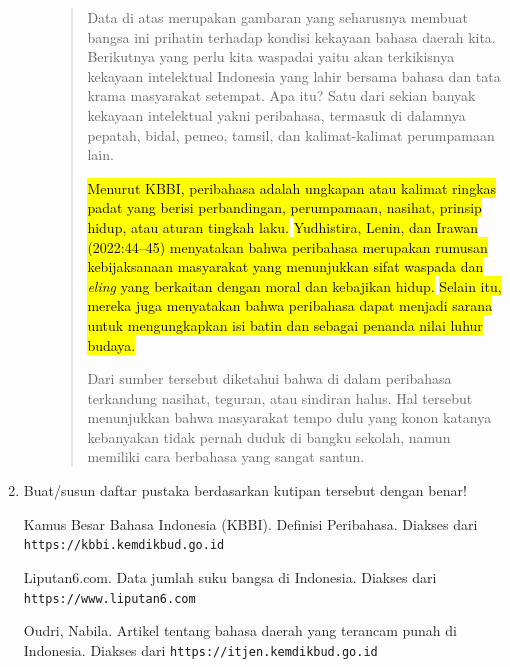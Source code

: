 \documentclass[12pt]{article}
\begin{document}
\begin{enumerate}
\begin{enumerate}
\begin{quote}
Data di atas merupakan gambaran yang seharusnya membuat bangsa ini prihatin terhadap kondisi kekayaan bahasa daerah kita. Berikutnya yang perlu kita waspadai yaitu akan terkikisnya kekayaan intelektual Indonesia yang lahir bersama bahasa dan tata krama masyarakat setempat. Apa itu? Satu dari sekian banyak kekayaan intelektual yakni peribahasa, termasuk di dalamnya pepatah, bidal, pemeo, tamsil, dan kalimat-kalimat perumpamaan lain.

\hl{Menurut KBBI, peribahasa adalah ungkapan atau kalimat ringkas padat yang berisi perbandingan, perumpamaan, nasihat, prinsip hidup, atau aturan tingkah laku.} \hl{Yudhistira, Lenin, dan Irawan (2022:44--45) menyatakan bahwa peribahasa merupakan rumusan kebijaksanaan masyarakat yang menunjukkan sifat waspada dan \textit{eling} yang berkaitan dengan moral dan kebajikan hidup.} \hl{Selain itu, mereka juga menyatakan bahwa peribahasa dapat menjadi sarana untuk mengungkapkan isi batin dan sebagai penanda nilai luhur budaya.}

Dari sumber tersebut diketahui bahwa di dalam peribahasa terkandung nasihat, teguran, atau sindiran halus. Hal tersebut menunjukkan bahwa masyarakat tempo dulu yang konon katanya kebanyakan tidak pernah duduk di bangku sekolah, namun memiliki cara berbahasa yang sangat santun.
\end{quote}

\end{enumerate}

\vspace{0.5cm}

\item Buat/susun daftar pustaka berdasarkan kutipan tersebut dengan benar!

\begin{thebibliography}{9}

\bibitem{}
Kamus Besar Bahasa Indonesia (KBBI). Definisi Peribahasa. Diakses dari \texttt{https://kbbi.kemdikbud.go.id}

\bibitem{}
Liputan6.com. Data jumlah suku bangsa di Indonesia. Diakses dari \texttt{https://www.liputan6.com}

\bibitem{}
Oudri, Nabila. Artikel tentang bahasa daerah yang terancam punah di Indonesia. Diakses dari \texttt{https://itjen.kemdikbud.go.id}

\end{thebibliography}

\vspace{0.5cm}


\end{enumerate}
\end{document}
